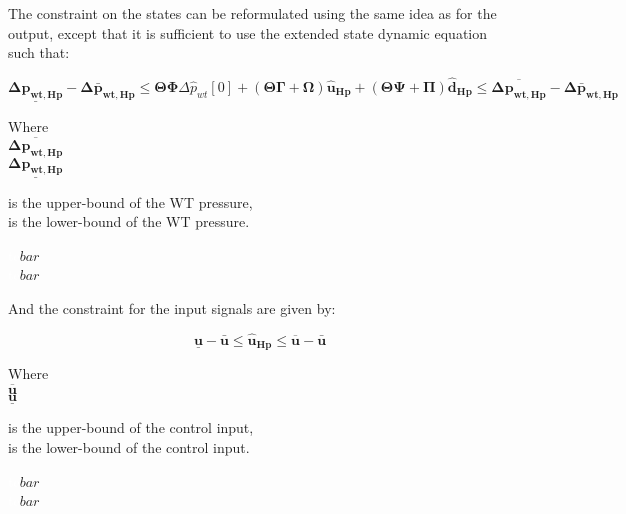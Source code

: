 

The constraint on the states can be reformulated using the same idea as for the output, except that it is sufficient to use the extended state dynamic equation such that: 

\begin{equation}
	\underline{\bm{\Delta p_{wt,Hp}}} - \bm{\Delta \bar{p}_{wt,Hp}} \leq \bm{\Theta} \bm{\Phi} \Delta \hat{p}_{wt}[0] +  (\bm{\Theta} \bm{\Gamma}+  \bm{\Omega}) \bm{\hat{u}_{Hp}} + (\bm{\Theta} \bm{\Psi} + \bm{\Pi})  \bm{\hat{d}_{Hp}} \leq \overline{\bm{\Delta p_{wt,Hp}}} - \bm{\Delta \bar{p}_{wt,Hp}} 
	\label{eq:stateconstraint}
\end{equation}

\begin{minipage}[t]{0.20\textwidth}
Where\\
\hspace*{8mm} $ \overline{\bm{\Delta p_{wt,Hp}}} $ \\
\hspace*{8mm} $ \underline{\bm{\Delta p_{wt,Hp}}} $ 
\end{minipage}
\begin{minipage}[t]{0.68\textwidth}
\vspace*{2mm}
is the upper-bound of the WT pressure, \\
is the lower-bound of the WT pressure. 
\end{minipage}
\begin{minipage}[t]{0.10\textwidth}
\vspace*{1.8mm}
\textcolor{White}{te}$\unit{bar}$\\
\textcolor{White}{te}$\unit{bar}$
\end{minipage}

And the constraint for the input signals are given by: 

\begin{equation}
\underline{\bm{u}} - \bm{\bar{u}} \leq \bm{\hat{u}_{Hp}} \leq \overline{\bm{{u}}} - \bm{\bar{u}}
\label{eq:inputconstraint}
\end{equation}

\begin{minipage}[t]{0.20\textwidth}
Where\\
\hspace*{8mm} $ \overline{\bm{u}} $ \\
\hspace*{8mm} $ \underline{\bm{u}} $ 
\end{minipage}
\begin{minipage}[t]{0.68\textwidth}
\vspace*{2mm}
is the upper-bound of the control input, \\
is the lower-bound of the control input. 
\end{minipage}
\begin{minipage}[t]{0.10\textwidth}
\vspace*{1.8mm}
\textcolor{White}{te}$\unit{bar}$\\
\textcolor{White}{te}$\unit{bar}$
\end{minipage}

